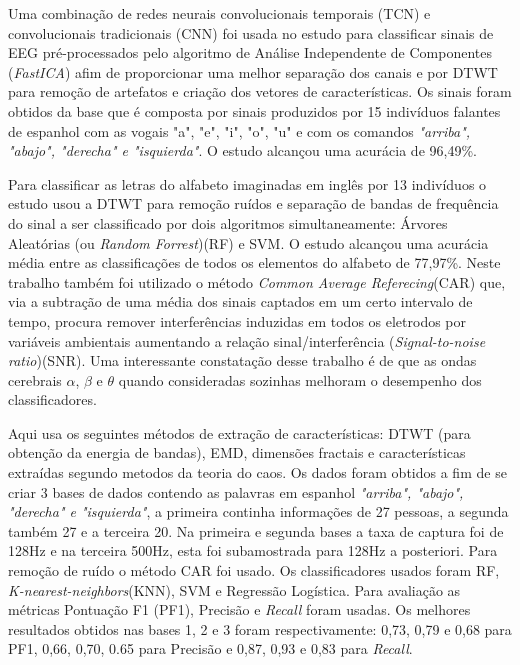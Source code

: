			\par Uma combinação de redes neurais convolucionais temporais (TCN) e convolucionais tradicionais (CNN) foi usada no estudo \cite{MahapatraNrushinghCharan2022MCoI} para classificar sinais de EEG pré-processados pelo algoritmo de Análise Independente de Componentes (\textit{FastICA}) afim de proporcionar uma melhor separação dos canais e por DTWT para remoção de artefatos e criação dos vetores de características. Os sinais foram obtidos da base \cite{10.1117/12.2255697} que é composta por sinais produzidos por 15 indivíduos falantes de espanhol com as vogais "a", "e", "i", "o", "u" e com os comandos \textit{"arriba", "abajo", "derecha" e "isquierda"}. O estudo alcançou uma acurácia de 96,49\%.

			\par Para classificar as letras do alfabeto imaginadas em inglês por 13 indivíduos o estudo \cite{AgarwalPrabhakar2022Ebia} usou a DTWT para remoção ruídos e separação de bandas de frequência do sinal a ser classificado por dois algoritmos simultaneamente: Árvores Aleatórias (ou \textit{Random Forrest})(RF) e SVM. O estudo alcançou uma acurácia média entre as classificações de todos os elementos do alfabeto de 77,97\%. Neste trabalho também foi utilizado o método \textit{Common Average Referecing}(CAR) que, via a subtração de uma média dos sinais captados em um certo intervalo de tempo, procura remover interferências induzidas em todos os eletrodos por variáveis ambientais aumentando a relação sinal/interferência (\textit{Signal-to-noise ratio})(SNR). Uma interessante constatação desse trabalho é de que as ondas cerebrais $\alpha$, $\beta$ e $\theta$ quando consideradas sozinhas melhoram o desempenho dos classificadores.
			
			\par Aqui \cite{Hernandez-Del-ToroTonatiuh2021TaEB} usa os seguintes métodos de extração de características: DTWT (para obtenção da energia de bandas), EMD, dimensões fractais e características extraídas segundo metodos da teoria do caos. Os dados foram obtidos a fim de se criar 3 bases de dados contendo as palavras em espanhol \textit{"arriba", "abajo", "derecha" e "isquierda"}, a primeira continha informações de 27 pessoas, a segunda também 27 e a terceira 20. Na primeira e segunda bases a taxa de captura foi de 128Hz e na terceira 500Hz, esta foi subamostrada para 128Hz a posteriori. Para remoção de ruído o método CAR foi usado. Os classificadores usados foram RF, \textit{K-nearest-neighbors}(KNN), SVM e Regressão Logística. Para avaliação as métricas Pontuação F1 (PF1), Precisão e \textit{Recall} foram usadas. Os melhores resultados obtidos nas bases 1, 2 e 3 foram respectivamente: 0,73, 0,79 e 0,68 para PF1, 0,66, 0,70, 0.65 para Precisão e 0,87, 0,93 e 0,83 para \textit{Recall}.
			
